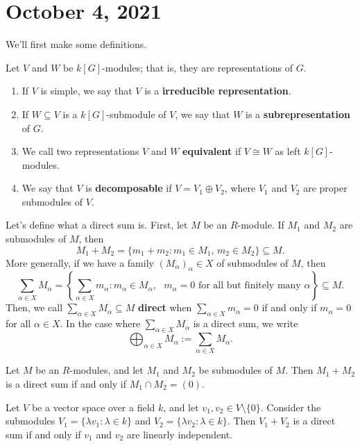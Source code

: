 \section{October 4, 2021}
We'll first make some definitions. 

\begin{defn} Let $V$ and $W$ be $k[G]$-modules; that is, they are 
    representations of $G$. 
    \begin{enumerate}[(1)]
        \item If $V$ is simple, we say that $V$ is a {\bf irreducible representation}.
        \item If $W \subseteq V$ is a $k[G]$-submodule of $V$, we say that $W$ is a 
        {\bf subrepresentation} of $G$. 
        \item We call two representations $V$ and $W$ {\bf equivalent} if 
        $V \cong W$ as left $k[G]$-modules. 
        \item We say that $V$ is {\bf decomposable} if $V = V_1 \oplus V_2$, 
        where $V_1$ and $V_2$ are proper submodules of $V$. 
    \end{enumerate}
\end{defn}

Let's define what a direct sum is. First, let $M$ be an $R$-module. 
If $M_1$ and $M_2$ are submodules of $M$, then 
\[ M_1 + M_2 = \{m_1 + m_2 : m_1 \in M_1,\, m_2 \in M_2\} \subseteq M. \] 
More generally, if we have a family $(M_\alpha)_\alpha \in X$ of submodules of 
$M$, then 
\[ \sum_{\alpha \in X} M_\alpha = \left\{ \sum_{\alpha \in X} m_\alpha : 
m_\alpha \in M_\alpha, \text{ $m_\alpha = 0$ for all but finitely many 
$\alpha$}\right\} \subseteq M. \] 
Then, we call $\sum_{\alpha \in X} M_\alpha \subseteq M$ 
{\bf direct} when $\sum_{\alpha \in X} m_\alpha = 0$ if and only if 
$m_\alpha = 0$ for all $\alpha \in X$. In the case where 
$\sum_{\alpha \in X} M_\alpha$ is a direct sum, we write 
\[ \bigoplus_{\alpha \in X} M_\alpha := \sum_{\alpha \in X} M_\alpha. \] 

\begin{remark}
    Let $M$ be an $R$-modules, and let $M_1$ and $M_2$ be submodules of $M$. 
    Then $M_1 + M_2$ is a direct sum if and only if $M_1 \cap M_2 = (0)$. 
\end{remark} 

\begin{exmp}
    Let $V$ be a vector space over a field $k$, and let $v_1, v_2 \in V 
    \setminus \{0\}$. Consider the submodules $V_1 = \{\lambda v_1 : \lambda 
    \in k\}$ and $V_2 = \{\lambda v_2 : \lambda \in k\}$. Then $V_1 + V_2$ is a 
    direct sum if and only if $v_1$ and $v_2$ are linearly independent. 
\end{exmp}

